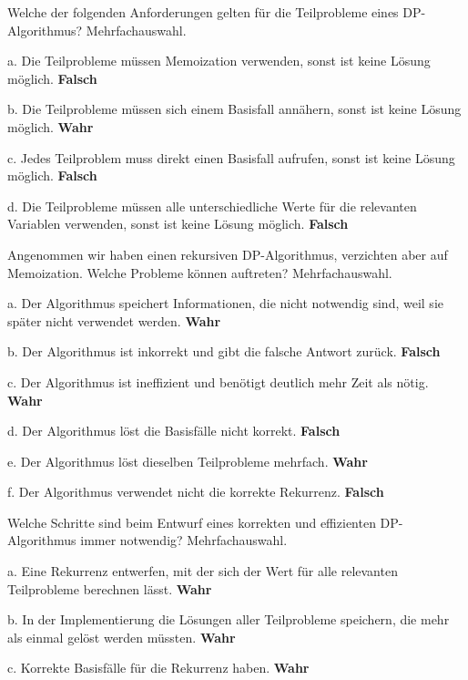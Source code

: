 \begin{contentbox}
Welche der folgenden Anforderungen gelten für die Teilprobleme eines DP-Algorithmus? Mehrfachauswahl.
\begin{factlist}
    \item a. Die Teilprobleme müssen Memoization verwenden, sonst ist keine Lösung möglich. \textbf{Falsch}
    \item b. Die Teilprobleme müssen sich einem Basisfall annähern, sonst ist keine Lösung möglich. \textbf{Wahr}
    \item c. Jedes Teilproblem muss direkt einen Basisfall aufrufen, sonst ist keine Lösung möglich. \textbf{Falsch}
    \item d. Die Teilprobleme müssen alle unterschiedliche Werte für die relevanten Variablen verwenden, sonst ist keine Lösung möglich. \textbf{Falsch}
\end{factlist}
\end{contentbox}

\begin{contentbox}
Angenommen wir haben einen rekursiven DP-Algorithmus, verzichten aber auf Memoization. Welche Probleme können auftreten? Mehrfachauswahl.
\begin{factlist}
    \item a. Der Algorithmus speichert Informationen, die nicht notwendig sind, weil sie später nicht verwendet werden. \textbf{Wahr}
    \item b. Der Algorithmus ist inkorrekt und gibt die falsche Antwort zurück. \textbf{Falsch}
    \item c. Der Algorithmus ist ineffizient und benötigt deutlich mehr Zeit als nötig. \textbf{Wahr}
    \item d. Der Algorithmus löst die Basisfälle nicht korrekt. \textbf{Falsch}
    \item e. Der Algorithmus löst dieselben Teilprobleme mehrfach. \textbf{Wahr}
    \item f. Der Algorithmus verwendet nicht die korrekte Rekurrenz. \textbf{Falsch}
\end{factlist}
\end{contentbox}

\begin{contentbox}
Welche Schritte sind beim Entwurf eines korrekten und effizienten DP-Algorithmus immer notwendig? Mehrfachauswahl.
\begin{factlist}
    \item a. Eine Rekurrenz entwerfen, mit der sich der Wert für alle relevanten Teilprobleme berechnen lässt. \textbf{Wahr}
    \item b. In der Implementierung die Lösungen aller Teilprobleme speichern, die mehr als einmal gelöst werden müssten. \textbf{Wahr}
    \item c. Korrekte Basisfälle für die Rekurrenz haben. \textbf{Wahr}
\end{factlist}
\end{contentbox}

